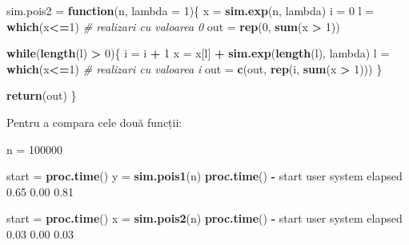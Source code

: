 \documentclass[]{article}
\newenvironment{Shaded}{\begin{snugshade}}{\end{snugshade}}
\newcommand{\CommentTok}[1]{\textcolor[rgb]{0.56,0.35,0.01}{\textit{#1}}}
\newcommand{\ControlFlowTok}[1]{\textcolor[rgb]{0.13,0.29,0.53}{\textbf{#1}}}
\newcommand{\DataTypeTok}[1]{\textcolor[rgb]{0.13,0.29,0.53}{#1}}
\newcommand{\DecValTok}[1]{\textcolor[rgb]{0.00,0.00,0.81}{#1}}
\newcommand{\FloatTok}[1]{\textcolor[rgb]{0.00,0.00,0.81}{#1}}
\newcommand{\KeywordTok}[1]{\textcolor[rgb]{0.13,0.29,0.53}{\textbf{#1}}}
\newcommand{\NormalTok}[1]{#1}
\newcommand{\OperatorTok}[1]{\textcolor[rgb]{0.81,0.36,0.00}{\textbf{#1}}}
\newcommand{\StringTok}[1]{\textcolor[rgb]{0.31,0.60,0.02}{#1}}
\begin{document}
\begin{Shaded}
\begin{Highlighting}[]
\NormalTok{sim.pois2 =}\StringTok{ }\ControlFlowTok{function}\NormalTok{(n, }\DataTypeTok{lambda =} \DecValTok{1}\NormalTok{)\{}
\NormalTok{  x =}\StringTok{ }\KeywordTok{sim.exp}\NormalTok{(n, lambda)}
\NormalTok{  i =}\StringTok{ }\DecValTok{0}
\NormalTok{  l =}\StringTok{ }\KeywordTok{which}\NormalTok{(x}\OperatorTok{<=}\DecValTok{1}\NormalTok{)}
  \CommentTok{# realizari cu valoarea 0}
\NormalTok{  out =}\StringTok{ }\KeywordTok{rep}\NormalTok{(}\DecValTok{0}\NormalTok{, }\KeywordTok{sum}\NormalTok{(x }\OperatorTok{>}\StringTok{ }\DecValTok{1}\NormalTok{)) }
  
  \ControlFlowTok{while}\NormalTok{(}\KeywordTok{length}\NormalTok{(l) }\OperatorTok{>}\StringTok{ }\DecValTok{0}\NormalTok{)\{}
\NormalTok{    i =}\StringTok{ }\NormalTok{i }\OperatorTok{+}\StringTok{ }\DecValTok{1}
\NormalTok{    x =}\StringTok{ }\NormalTok{x[l] }\OperatorTok{+}\StringTok{ }\KeywordTok{sim.exp}\NormalTok{(}\KeywordTok{length}\NormalTok{(l), lambda)}
\NormalTok{    l =}\StringTok{ }\KeywordTok{which}\NormalTok{(x}\OperatorTok{<=}\DecValTok{1}\NormalTok{)}
    \CommentTok{# realizari cu valoarea i}
\NormalTok{    out =}\StringTok{ }\KeywordTok{c}\NormalTok{(out, }\KeywordTok{rep}\NormalTok{(i, }\KeywordTok{sum}\NormalTok{(x }\OperatorTok{>}\StringTok{ }\DecValTok{1}\NormalTok{))) }
\NormalTok{  \}}
  
  \KeywordTok{return}\NormalTok{(out)}
\NormalTok{\}}
\end{Highlighting}
\end{Shaded}

Pentru a compara cele două funcții:

\begin{Shaded}
\begin{Highlighting}[]
\NormalTok{n =}\StringTok{ }\DecValTok{100000}

\NormalTok{start =}\StringTok{ }\KeywordTok{proc.time}\NormalTok{()}
\NormalTok{y =}\StringTok{ }\KeywordTok{sim.pois1}\NormalTok{(n)}
\KeywordTok{proc.time}\NormalTok{() }\OperatorTok{-}\StringTok{ }\NormalTok{start}
\NormalTok{   user  system elapsed }
   \FloatTok{0.65}    \FloatTok{0.00}    \FloatTok{0.81} 

\NormalTok{start =}\StringTok{ }\KeywordTok{proc.time}\NormalTok{()}
\NormalTok{x =}\StringTok{ }\KeywordTok{sim.pois2}\NormalTok{(n)}
\KeywordTok{proc.time}\NormalTok{() }\OperatorTok{-}\StringTok{ }\NormalTok{start}
\NormalTok{   user  system elapsed }
   \FloatTok{0.03}    \FloatTok{0.00}    \FloatTok{0.03} 
\end{Highlighting}
\end{Shaded}
\end{document}
